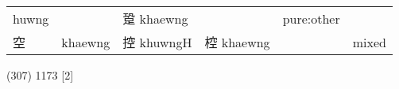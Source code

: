 \documentclass[14pt,a4paper]{scrartcl}
\begin{document}
\begin{longtable}[c]{@{}llllll@{}}
\begin{minipage}[t]{0.14\columnwidth}
huwng
\strut\end{minipage} &
\begin{minipage}[t]{0.14\columnwidth}\raggedright\strut
\strut\end{minipage} &
\begin{minipage}[t]{0.14\columnwidth}\raggedright\strut
跫 khaewng
\strut\end{minipage} &
\begin{minipage}[t]{0.14\columnwidth}\raggedright\strut
\strut\end{minipage} &
\begin{minipage}[t]{0.14\columnwidth}\raggedright\strut
pure:other
\strut\end{minipage}\tabularnewline
\begin{minipage}[t]{0.14\columnwidth}\raggedright\strut
空
\strut\end{minipage} &
\begin{minipage}[t]{0.14\columnwidth}\raggedright\strut
khaewng
\strut\end{minipage} &
\begin{minipage}[t]{0.14\columnwidth}\raggedright\strut
控 khuwngH
\strut\end{minipage} &
\begin{minipage}[t]{0.14\columnwidth}\raggedright\strut
椌 khaewng
\strut\end{minipage} &
\begin{minipage}[t]{0.14\columnwidth}\raggedright\strut
\strut\end{minipage} &
\begin{minipage}[t]{0.14\columnwidth}\raggedright\strut
mixed
\strut\end{minipage}\tabularnewline
\bottomrule
\end{longtable}

(307) 1173 {[}2{]}
\end{document}
